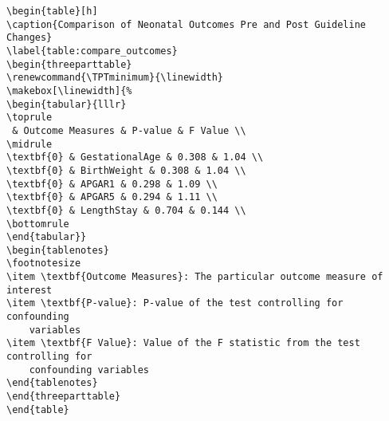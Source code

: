 \documentclass[11pt]{article}
\begin{document}
\begin{Verbatim}[tabsize=4]
\begin{table}[h]
\caption{Comparison of Neonatal Outcomes Pre and Post Guideline Changes}
\label{table:compare_outcomes}
\begin{threeparttable}
\renewcommand{\TPTminimum}{\linewidth}
\makebox[\linewidth]{%
\begin{tabular}{lllr}
\toprule
 & Outcome Measures & P-value & F Value \\
\midrule
\textbf{0} & GestationalAge & 0.308 & 1.04 \\
\textbf{0} & BirthWeight & 0.308 & 1.04 \\
\textbf{0} & APGAR1 & 0.298 & 1.09 \\
\textbf{0} & APGAR5 & 0.294 & 1.11 \\
\textbf{0} & LengthStay & 0.704 & 0.144 \\
\bottomrule
\end{tabular}}
\begin{tablenotes}
\footnotesize
\item \textbf{Outcome Measures}: The particular outcome measure of interest
\item \textbf{P-value}: P-value of the test controlling for confounding
	variables
\item \textbf{F Value}: Value of the F statistic from the test controlling for
	confounding variables
\end{tablenotes}
\end{threeparttable}
\end{table}

\end{Verbatim}




\end{document}
